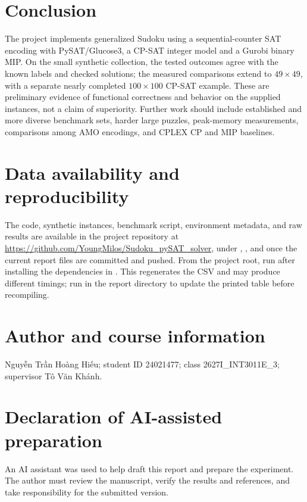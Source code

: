 \documentclass[a4paper,fleqn]{cas-sc}
\begin{document}
\section{Conclusion}
The project implements generalized Sudoku using a sequential-counter SAT encoding with PySAT/Glucose3, a CP-SAT integer model and a Gurobi binary MIP. On the small synthetic collection, the tested outcomes agree with the known labels and checked solutions; the measured comparisons extend to \(49\times49\), with a separate nearly completed \(100\times100\) CP-SAT example. These are preliminary evidence of functional correctness and behavior on the supplied instances, not a claim of superiority. Further work should include established and more diverse benchmark sets, harder large puzzles, peak-memory measurements, comparisons among AMO encodings, and CPLEX CP and MIP baselines.

\section*{Data availability and reproducibility}
The code, synthetic instances, benchmark script, environment metadata, and raw results are available in the project repository at \url{https://github.com/YoungMilos/Sudoku_pySAT_solver}, under , , and  once the current report files are committed and pushed. From the project root, run  after installing the dependencies in . This regenerates the CSV and may produce different timings; run  in the report directory to update the printed table before recompiling.

\section*{Author and course information}
Nguy{\~{\^e}}n Tr{\`{\^a}}n Ho{\`a}ng Hi{\'{\^e}}u; student ID 24021477; class 2627I\_INT3011E\_3; supervisor T{\^o} V{\u a}n Kh{\'a}nh.

\section*{Declaration of AI-assisted preparation}
An AI assistant was used to help draft this report and prepare the experiment. The author must review the manuscript, verify the results and references, and take responsibility for the submitted version.
\end{document}
